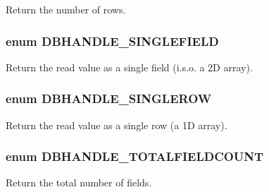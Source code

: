 Return the number of rows. 

\hypertarget{class_8dbhandler_8php_4752b0fc86256fd568adf6ef216418c7}{
\subsubsection{\setlength{\rightskip}{0pt plus 5cm}enum {\bf DBHANDLE\_\-SINGLEFIELD}}}
\label{class_8dbhandler_8php_4752b0fc86256fd568adf6ef216418c7}


Return the read value as a single field (i.s.o. a 2D array). 

\hypertarget{class_8dbhandler_8php_5c8464b7bfbb63bd605046e8b615dbbe}{
\subsubsection{\setlength{\rightskip}{0pt plus 5cm}enum {\bf DBHANDLE\_\-SINGLEROW}}}
\label{class_8dbhandler_8php_5c8464b7bfbb63bd605046e8b615dbbe}


Return the read value as a single row (a 1D array). 

\hypertarget{class_8dbhandler_8php_a74936d65eaded5fe8d34047a73e4cea}{
\subsubsection{\setlength{\rightskip}{0pt plus 5cm}enum {\bf DBHANDLE\_\-TOTALFIELDCOUNT}}}
\label{class_8dbhandler_8php_a74936d65eaded5fe8d34047a73e4cea}


Return the total number of fields. 

